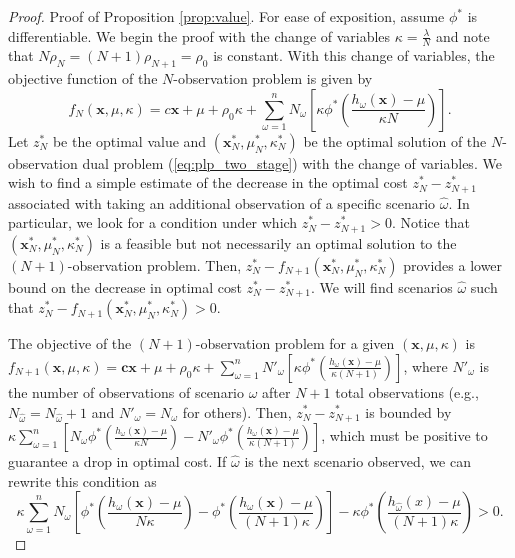 \documentclass[opre,nonblindrev]{informs3} %
\newcommand{\x}{\mathbf{x}}
\renewcommand{\c}{\mathbf{c}}
\begin{document}
\begin{proof}{\sc Proof of Proposition \ref{prop:value}.}
	For ease of exposition, assume $\phi^*$ is differentiable.
	We begin the proof with the change of variables $\kappa = \frac{\lambda}{N}$ and note that $N\rho_N = (N+1)\rho_{N+1} =\rho_0$ is constant.	
	With this change of variables, the objective function of the $N$-observation problem is given by
	\[
		f_N(\x,\mu,\kappa) = c\x + \mu + \rho_0 \kappa + \sum_{\omega = 1}^n N_\omega \left[ \kappa \phi^*\left(\frac{h_\omega(\x) - \mu}{\kappa N} \right) \right].
	\]
	Let $z_N^*$ be the optimal value and  $(\x^*_N,\mu^*_N,\kappa^*_N)$ be the optimal solution of the $N$-observation dual problem (\ref{eq:plp_two_stage}) with the change of variables.
	We wish to find a simple estimate of the decrease in the optimal cost $z_N^* - z_{N+1}^*$ associated with taking an additional observation of a specific scenario $\hat{\omega}$.
In particular, we look for a condition under which $z_N^* - z_{N+1}^* > 0$.	
	Notice that $(\x^*_N,\mu^*_N,\kappa^*_N)$ is a feasible but not necessarily an optimal solution to the $(N+1)$-observation problem.
	Then, $z_N^* - f_{N+1}(\x^*_N,\mu^*_N,\kappa^*_N)$ provides a lower bound on the decrease in optimal cost $z_N^* - z_{N+1}^*$.
	We will find scenarios $\hat{\omega}$ such that $z_N^* - f_{N+1}(\x^*_N,\mu^*_N,\kappa^*_N) > 0$.

	The objective of the $(N+1)$-observation problem for a given $(\x,\mu,\kappa)$ is $ f_{N+1}(\x,\mu,\kappa) = \c\x + \mu + \rho_0 \kappa + \sum_{\omega = 1}^n N'_\omega \left[ \kappa \phi^*\left(\frac{h_\omega(\x) - \mu}{\kappa (N+1)} \right) \right]$,	where $N'_\omega$ is the number of observations of scenario $\omega$ after $N+1$ total observations (e.g., $N_{\hat{\omega}}=N_{\hat{\omega}}+1$ and $N'_\omega = N_\omega$ for others).
	Then, $z_N^* - z_{N+1}^*$ is bounded by $\kappa \sum_{\omega=1}^n \left[ N_\omega \phi^*\left(\frac{h_\omega(\x) - \mu}{\kappa N} \right) - N'_\omega \phi^*\left(\frac{h_\omega(\x) - \mu}{\kappa (N+1)} \right) \right]$, which must be positive to guarantee a drop in optimal cost.
	If $\hat{\omega}$ is the next scenario observed, we can rewrite this condition as
	\begin{equation} \label{eq:raw_cond}
		\kappa \sum_{\omega=1}^n N_\omega \left[ \phi^*\left(\frac{h_\omega(\x) - \mu}{N\kappa} \right) - \phi^*\left(\frac{h_\omega(\x) - \mu}{(N+1)\kappa} \right) \right] - \kappa \phi^*\left(\frac{h_{\hat{\omega}}(x) - \mu}{(N+1)\kappa}\right) > 0.
	\end{equation}


\end{proof}
\end{document}
